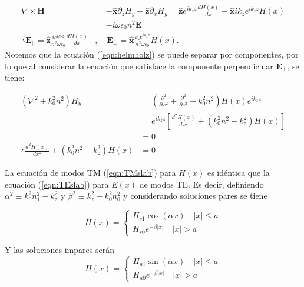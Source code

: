 \begin{align*}
	\nabla\times\textbf{H} &= -\mathbf{\hat{x}} \partial_z H_y+ \mathbf{\hat{z}} \partial_x H_y = \mathbf{\hat{z}} e^{i k_z z }\frac{d H(x)}{dx} - \mathbf{\hat{x}} ik_z  e^{i k_z z } H(x)  
	\\	
	&= -i\omega\epsilon_0 n^2 \textbf{E}
	\\
	\therefore \textbf{E}_{||} = \mathbf{\hat{z}} \frac{ie^{i k_z z }}{n^2 \omega \epsilon_0} \frac{d H(x)}{dx}&,\quad \textbf{E}_\perp =  \mathbf{\hat{x}} \frac{k_z e^{i k_z z }}{n^2 \omega \epsilon_0 }   H(x).
\end{align*} 
Notemos que la ecuación (\ref{eqn:helmholz}) se puede separar por componentes, por lo que al considerar la ecuación que satisface la componente perpendicular $\textbf{E}_\perp$, se tiene:

\begin{align}
	(\nabla^2 + k_0^2 n^2) H_y
	&= \left(\frac{\partial^2}{\partial x^2} + \frac{\partial^2}{\partial z^2} + k_0^2n^2\right) H(x)e^{ik_z z }
	\nonumber
	\\
&= e^{ik_z z}\left[\frac{d^2  H(x)}{dx^2}  + (k_0^2n^2 -  k_z^2)H(x) \right]
\nonumber	
	\\	
	&= 0 
	\nonumber	
	\\
	\therefore 
	\frac{d^2  H(x)}{dx^2}  + (k_0^2n^2 -  k_z^2)H(x) &= 0
	\label{eqn:TMslab}
\end{align} 

La ecuación de modos TM (\ref{eqn:TMslab}) para $H(x)$ es idéntica que la ecuación (\ref{eqn:TEslab}) para $E(x)$ de modos TE. Es decir, definiendo $\alpha^2\equiv k_0^2n_1^2-k_z^2$ y $\beta^2\equiv k_z^2 - k_0^2n_0^2$ y considerando soluciones pares se tiene

\begin{equation*}
	H(x) = \left\{\begin{matrix}
	H_{s1}\cos(\alpha x)\quad |x|\le a
	\\
	H_{s0}e^{-\beta|x|} \quad |x|>a
	\end{matrix}\right.
\end{equation*}

Y las soluciones impares serán
\begin{equation*}
	H(x) = \left\{\begin{matrix}
	H_{a1}\sin(\alpha x)\quad |x|\le a
	\\
	H_{a0}e^{-\beta|x|} \quad |x|>a
	\end{matrix}\right.
\end{equation*}


